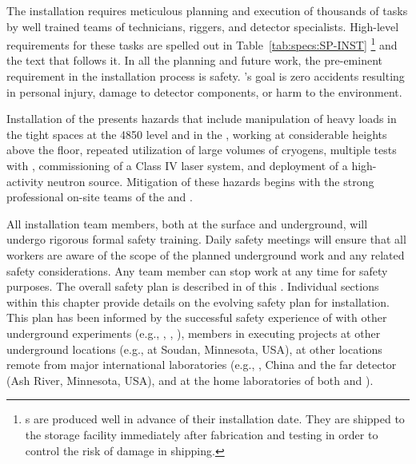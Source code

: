 The installation requires meticulous planning and execution of thousands of tasks by well trained teams of technicians, riggers, and detector specialists. 
High-level requirements for these tasks are spelled out in Table~\ref{tab:specs:SP-INST}
\footnote{s are produced well in advance of their installation date. They are shipped to the storage facility immediately after fabrication and testing in order to control the risk of damage in shipping.} 
and the text that follows it. 
In all the planning and future work, the pre-eminent requirement in the installation process is safety.
's goal is zero accidents resulting in personal injury, damage to detector components, or harm to the environment.


%


Installation of the  presents %
 hazards that include manipulation of heavy loads in the tight spaces at the 4850 level and in the ,  working at considerable heights above the floor, repeated utilization of large volumes of cryogens, multiple tests with , commissioning of a Class IV laser system, and deployment of a high-activity neutron source. Mitigation of these hazards begins with the strong professional on-site  teams of the  and .

All installation team members, both at the surface and underground, will undergo rigorous formal safety training. Daily safety meetings will ensure that all workers are aware of the scope of the planned underground work and any related safety considerations. Any team member can stop work at any time for safety purposes. The overall  safety plan is described in   
 \tcchesh{} %
 of this .  Individual sections within this chapter provide details on the evolving safety plan for installation. This plan has been informed by the successful safety experience of  with other underground experiments (e.g., , , ),  members in executing projects at other underground locations (e.g.,  at Soudan, Minnesota, USA), at other locations remote from major international laboratories (e.g., , China and the  far detector (Ash River, Minnesota, USA), and at the home laboratories of both  and ).


